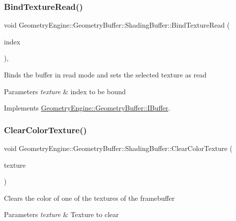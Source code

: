 \subsubsection{\texorpdfstring{BindTextureRead()}{BindTextureRead()}}
{\footnotesize\ttfamily void Geometry\+Engine\+::\+Geometry\+Buffer\+::\+Shading\+Buffer\+::\+Bind\+Texture\+Read (\begin{DoxyParamCaption}\item[{unsigned int}]{index }\end{DoxyParamCaption})\hspace{0.3cm}{\ttfamily [override]}, {\ttfamily [virtual]}}

Binds the buffer in read mode and sets the selected texture as read 
\begin{DoxyParams}{Parameters}
{\em texture} & index to be bound \\
\hline
\end{DoxyParams}


Implements \mbox{\hyperlink{class_geometry_engine_1_1_geometry_buffer_1_1_i_buffer_ab4c82eeb6d07ea902e0de3fad67c29f2}{Geometry\+Engine\+::\+Geometry\+Buffer\+::\+I\+Buffer}}.

\mbox{\label{class_geometry_engine_1_1_geometry_buffer_1_1_shading_buffer_aea07ae2845342993bc8949f7e52a4c90}} 
\subsubsection{\texorpdfstring{ClearColorTexture()}{ClearColorTexture()}}
{\footnotesize\ttfamily void Geometry\+Engine\+::\+Geometry\+Buffer\+::\+Shading\+Buffer\+::\+Clear\+Color\+Texture (\begin{DoxyParamCaption}\item[{\mbox{\hyperlink{class_geometry_engine_1_1_geometry_buffer_1_1_shading_buffer_a8047a079ff9fb9fa3400651664c92ae9}{S\+H\+A\+D\+I\+N\+G\+B\+U\+F\+F\+E\+R\+\_\+\+T\+E\+X\+T\+U\+R\+E\+\_\+\+T\+Y\+PE}}}]{texture }\end{DoxyParamCaption})}

Clears the color of one of the textures of the framebuffer 
\begin{DoxyParams}{Parameters}
{\em texture} & Texture to clear \\
\hline
\end{DoxyParams}
\mbox{\label{class_geometry_engine_1_1_geometry_buffer_1_1_shading_buffer_a608f7a6fbde69056a268fac83caecfab}} 
